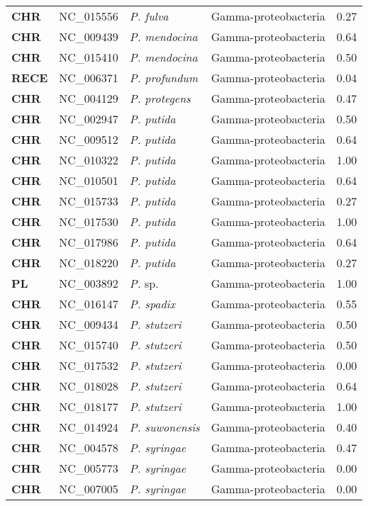 \begin{adjustwidth}{-3cm}{2cm}
{\begin{supertabular}{>{\bfseries}l|p{0.1\textwidth}p{0.14\textwidth}l|l}
CHR & NC\_015556 & \textit{P. fulva} & Gamma-proteobacteria & 0.27\\
CHR & NC\_009439 & \textit{P. mendocina} & Gamma-proteobacteria & 0.64\\
CHR & NC\_015410 & \textit{P. mendocina} & Gamma-proteobacteria & 0.50\\
RECE & NC\_006371 & \textit{P. profundum} & Gamma-proteobacteria & 0.04\\
CHR & NC\_004129 & \textit{P. protegens} & Gamma-proteobacteria & 0.47\\
CHR & NC\_002947 & \textit{P. putida} & Gamma-proteobacteria & 0.50\\
CHR & NC\_009512 & \textit{P. putida} & Gamma-proteobacteria & 0.64\\
CHR & NC\_010322 & \textit{P. putida} & Gamma-proteobacteria & 1.00\\
CHR & NC\_010501 & \textit{P. putida} & Gamma-proteobacteria & 0.64\\
CHR & NC\_015733 & \textit{P. putida} & Gamma-proteobacteria & 0.27\\
CHR & NC\_017530 & \textit{P. putida} & Gamma-proteobacteria & 1.00\\
CHR & NC\_017986 & \textit{P. putida} & Gamma-proteobacteria & 0.64\\
CHR & NC\_018220 & \textit{P. putida} & Gamma-proteobacteria & 0.27\\
PL & NC\_003892 & \textit{P. }sp. & Gamma-proteobacteria & 1.00\\
CHR & NC\_016147 & \textit{P. spadix} & Gamma-proteobacteria & 0.55\\
CHR & NC\_009434 & \textit{P. stutzeri} & Gamma-proteobacteria & 0.50\\
CHR & NC\_015740 & \textit{P. stutzeri} & Gamma-proteobacteria & 0.50\\
CHR & NC\_017532 & \textit{P. stutzeri} & Gamma-proteobacteria & 0.00\\
CHR & NC\_018028 & \textit{P. stutzeri} & Gamma-proteobacteria & 0.64\\
CHR & NC\_018177 & \textit{P. stutzeri} & Gamma-proteobacteria & 1.00\\
CHR & NC\_014924 & \textit{P. suwonensis} & Gamma-proteobacteria & 0.40\\
CHR & NC\_004578 & \textit{P. syringae} & Gamma-proteobacteria & 0.47\\
CHR & NC\_005773 & \textit{P. syringae} & Gamma-proteobacteria & 0.00\\
CHR & NC\_007005 & \textit{P. syringae} & Gamma-proteobacteria & 0.00\\

\end{supertabular}}
\end{adjustwidth}
